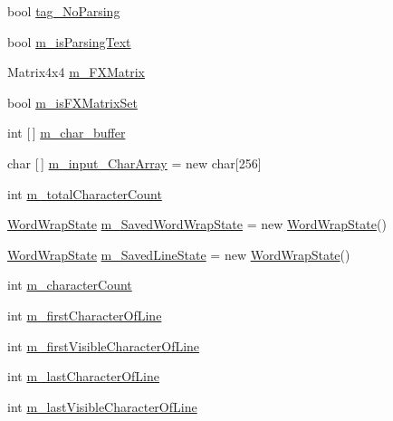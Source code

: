 \begin{DoxyCompactItemize}
\item 
bool \mbox{\hyperlink{class_t_m_pro_1_1_t_m_p___text_acaf217f4258e296314283033a3854272}{tag\+\_\+\+No\+Parsing}}
\item 
bool \mbox{\hyperlink{class_t_m_pro_1_1_t_m_p___text_ad674ee6627c8e77a717699dbad825a79}{m\+\_\+is\+Parsing\+Text}}
\item 
Matrix4x4 \mbox{\hyperlink{class_t_m_pro_1_1_t_m_p___text_a5bd69aba74fc6ededecb5143204d83af}{m\+\_\+\+F\+X\+Matrix}}
\item 
bool \mbox{\hyperlink{class_t_m_pro_1_1_t_m_p___text_aa9cd88e88466328c6c6be9362520cbc8}{m\+\_\+is\+F\+X\+Matrix\+Set}}
\item 
int \mbox{[}$\,$\mbox{]} \mbox{\hyperlink{class_t_m_pro_1_1_t_m_p___text_a7dc4ac8f7e2be896250460da253eb24a}{m\+\_\+char\+\_\+buffer}}
\item 
char \mbox{[}$\,$\mbox{]} \mbox{\hyperlink{class_t_m_pro_1_1_t_m_p___text_aecaccf0af62aa38ef66a15a3eaff1e8a}{m\+\_\+input\+\_\+\+Char\+Array}} = new char\mbox{[}256\mbox{]}
\item 
int \mbox{\hyperlink{class_t_m_pro_1_1_t_m_p___text_abedb5c5d6fd8f25b88c91f51d15dbbbf}{m\+\_\+total\+Character\+Count}}
\item 
\mbox{\hyperlink{struct_t_m_pro_1_1_word_wrap_state}{Word\+Wrap\+State}} \mbox{\hyperlink{class_t_m_pro_1_1_t_m_p___text_ab5a8796132737fab15ed45b5ebd8a166}{m\+\_\+\+Saved\+Word\+Wrap\+State}} = new \mbox{\hyperlink{struct_t_m_pro_1_1_word_wrap_state}{Word\+Wrap\+State}}()
\item 
\mbox{\hyperlink{struct_t_m_pro_1_1_word_wrap_state}{Word\+Wrap\+State}} \mbox{\hyperlink{class_t_m_pro_1_1_t_m_p___text_ae4f41b6ef963688730471f426fbc96de}{m\+\_\+\+Saved\+Line\+State}} = new \mbox{\hyperlink{struct_t_m_pro_1_1_word_wrap_state}{Word\+Wrap\+State}}()
\item 
int \mbox{\hyperlink{class_t_m_pro_1_1_t_m_p___text_a0fc988277e5de2c1fb0fad4953ab9a94}{m\+\_\+character\+Count}}
\item 
int \mbox{\hyperlink{class_t_m_pro_1_1_t_m_p___text_a3e4d1267c753b85ab0c534e32c933542}{m\+\_\+first\+Character\+Of\+Line}}
\item 
int \mbox{\hyperlink{class_t_m_pro_1_1_t_m_p___text_a0c6eca5bac7b1531d98c6637983f96c3}{m\+\_\+first\+Visible\+Character\+Of\+Line}}
\item 
int \mbox{\hyperlink{class_t_m_pro_1_1_t_m_p___text_a8b50ec93f6fa39e03cddea60cc648447}{m\+\_\+last\+Character\+Of\+Line}}
\item 
int \mbox{\hyperlink{class_t_m_pro_1_1_t_m_p___text_a735485bedfbb22f9351b798792695000}{m\+\_\+last\+Visible\+Character\+Of\+Line}}

\end{DoxyCompactItemize}
